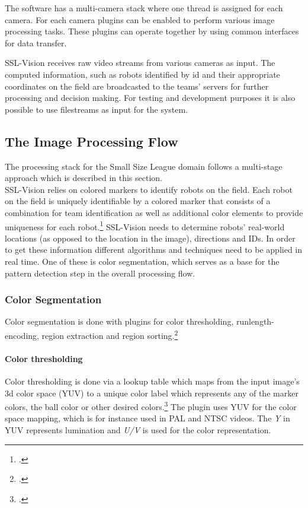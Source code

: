 The software has a multi-camera stack where one thread is assigned for each camera.
For each camera plugins can be enabled to perform various image processing
tasks. These plugins can operate together by using common interfaces for data
transfer.

SSL-Vision receives raw video streams from various cameras as input. The
computed information, such as robots identified by id and their appropriate
coordinates on the field are broadcasted to the teams' servers for further
processing and decision making. For testing and development purposes it is also
possible to use filestreams as input for the system.

\subsection{The Image Processing Flow}
The processing stack for the Small Size League domain follows a multi-stage
approach which is described in this section.\\
SSL-Vision relies on colored markers to identify robots on the field.
Each robot on the field is uniquely identifiable by a colored marker that
consists of a combination for team identification as well as additional color
elements to provide uniqueness for each robot.\footcite[Cf.][5]{zickler_ssl_vision}
SSL-Vision needs to determine robots' real-world locations (as opposed to the
location in the image), directions and IDs.
In order to get these information different algorithms and techniques need to be
applied in real time. One of these is color segmentation, which serves as a 
base for the pattern detection step in the overall processing flow.


\subsubsection{Color Segmentation}
Color segmentation is done with plugins for color thresholding, runlength-encoding,
region extraction and region sorting.\footcite[Cf.][]{zickler_ssl_vision}

\paragraph{Color thresholding}
Color thresholding is done via a lookup table which maps from the input image's
3d color space (YUV) to a unique color label which represents any of the marker
colors, the ball color or other desired colors.\footcite[Cf.][p. 4 et sq.]{zickler_ssl_vision}
The plugin uses YUV for the color space mapping, which is for instance used
in PAL and NTSC videos. The \textit{Y} in YUV represents lumination and
\textit{U/V} is used for the color representation.

